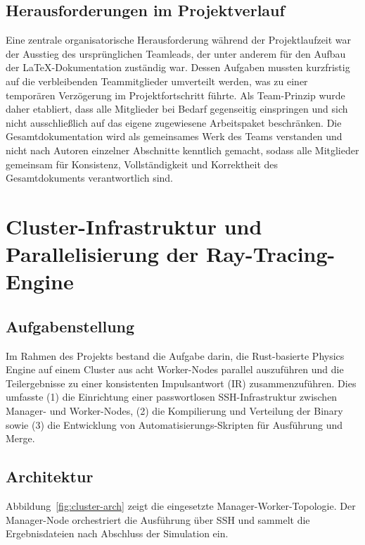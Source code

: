 \subsection{Herausforderungen im Projektverlauf}
\label{sec:herausforderungen-orga}

Eine zentrale organisatorische Herausforderung während der
Projektlaufzeit war der Ausstieg des ursprünglichen Teamleads, der unter
anderem für den Aufbau der LaTeX-Dokumentation zuständig war. Dessen Aufgaben mussten kurzfristig auf die verbleibenden Teammitglieder umverteilt werden, was zu einer temporären Verzögerung im Projektfortschritt führte. Als Team-Prinzip
wurde daher etabliert, dass alle Mitglieder bei Bedarf gegenseitig
einspringen und sich nicht ausschließlich auf das eigene zugewiesene
Arbeitspaket beschränken. Die Gesamtdokumentation wird
als gemeinsames Werk des Teams verstanden und nicht nach Autoren
einzelner Abschnitte kenntlich gemacht, sodass alle Mitglieder gemeinsam
für Konsistenz, Vollständigkeit und Korrektheit des Gesamtdokuments
verantwortlich sind.


\section{Cluster-Infrastruktur und Parallelisierung der Ray-Tracing-Engine}
\label{sec:cluster}

\subsection{Aufgabenstellung}

Im Rahmen des Projekts bestand die Aufgabe darin, die Rust-basierte Physics
Engine auf einem Cluster aus acht Worker-Nodes parallel auszuführen und die Teilergebnisse zu einer konsistenten Impulsantwort (IR) zusammenzuführen. Dies umfasste (1) die Einrichtung einer passwortlosen SSH-Infrastruktur zwischen Manager- und Worker-Nodes, (2) die Kompilierung und Verteilung der Binary sowie (3) die
Entwicklung von Automatisierungs-Skripten für Ausführung und Merge.

\subsection{Architektur}

Abbildung~\ref{fig:cluster-arch} zeigt die eingesetzte Manager-Worker-Topologie.
Der Manager-Node orchestriert die Ausführung über SSH und sammelt die
Ergebnisdateien nach Abschluss der Simulation ein.

